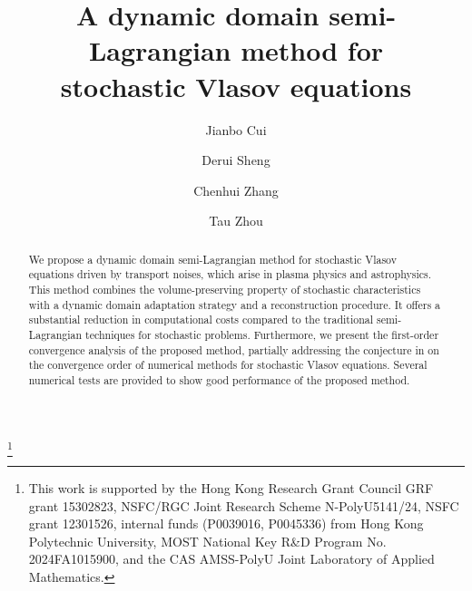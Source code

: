 \documentclass[11pt,reqno]{amsproc}
\numberwithin{equation}{section}
\begin{document}
\title[Dynamic domain semi-Lagrangian method]{A dynamic domain semi-Lagrangian method for\\ stochastic Vlasov equations}


\author{Jianbo Cui}%
\address{Department of Applied Mathematics, The Hong Kong Polytechnic University, Hung Hom, Kowloon, HongKong}

\author{Derui Sheng}%
\address{Department of Applied Mathematics, The Hong Kong Polytechnic University, Hung Hom, Kowloon, HongKong}

\author{Chenhui Zhang}%
\address{Department of Applied Mathematics, The Hong Kong Polytechnic University, Hung Hom, Kowloon, HongKong }
\author{Tau Zhou}%
\address{Key Laboratory of Computing and Stochastic Mathematics (Ministry of Education), School of Mathematics and Statistics, Hunan Normal University, Changsha, Hunan 410081, P. R. China}



\thanks{This work is supported by the Hong Kong Research Grant Council GRF grant 15302823, NSFC/RGC Joint Research Scheme N-PolyU5141/24, NSFC grant 12301526, internal funds (P0039016, P0045336) from Hong Kong Polytechnic University, MOST National Key R\&D Program No. 2024FA1015900, and the
CAS AMSS-PolyU Joint Laboratory of Applied Mathematics.
}




\begin{abstract}
We propose a dynamic domain semi-Lagrangian method for stochastic Vlasov equations driven by transport noises, which arise in plasma physics and astrophysics. 
This method combines the volume-preserving property of stochastic characteristics with a dynamic domain adaptation strategy and a reconstruction procedure.
It offers a substantial reduction in computational costs compared to the traditional semi-Lagrangian techniques for stochastic problems.
Furthermore, we present the first-order convergence analysis of the proposed method, partially addressing the conjecture in \cite{BC24} on the convergence order of numerical methods for stochastic Vlasov equations.
Several numerical tests are provided to show good performance of the proposed method.
\end{abstract}
\end{document}
